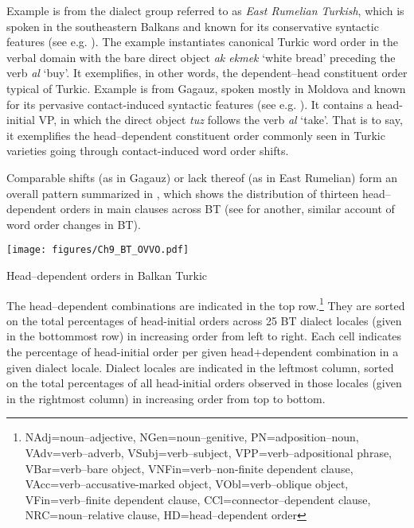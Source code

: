 \documentclass[output=paper,colorlinks,citecolor=brown]{langscibook}
\begin{document}
\noindent
Example  is from the dialect group referred to as \textit{East Rumelian Turkish}, which is spoken in the southeastern Balkans and known for its conservative syntactic features (see e.g. \citealt[49]{Johanson.2021}). The example instantiates canonical Turkic word order in the verbal domain with the bare direct object \textit{ak ekmek} `white bread' preceding the verb \textit{al} `buy'. It exemplifies, in other words, the dependent--head constituent order typical of Turkic. Example  is from Gagauz, spoken mostly in Moldova and known for its pervasive contact-induced syntactic features (see e.g. \citealt[50--51]{Johanson.2021}). It contains a head-initial VP, in which the direct object \textit{tuz} follows the verb \textit{al} `take'. That is to say, it exemplifies the head--dependent constituent order commonly seen in Turkic varieties going through contact-induced word order shifts. 

Comparable shifts (as in Gagauz) or lack thereof (as in East Rumelian) form an overall pattern summarized in , which shows the distribution of thirteen head--dependent orders in main clauses across BT (see \citealp{Keskin.directionality} for another, similar account of word order changes in BT).

\begin{table}
  \texttt{[image: figures/Ch9\_BT\_OVVO.pdf]}
  \caption{Head--dependent orders in Balkan Turkic}
  \label{tab:keskin:BT_OVVO}
\end{table}

The head--dependent combinations are indicated in the top row.\footnote{NAdj=noun--adjective, NGen=noun--genitive, PN=adposition--noun, VAdv=verb--adverb, VSubj=verb--subject, VPP=verb--adpositional phrase, VBar=verb--bare object, VNFin=verb--non-finite dependent clause, VAcc=verb--accusative-marked object, VObl=verb--oblique object, VFin=verb--finite dependent clause, CCl=connector--dependent clause, NRC=noun--relative clause, HD=head--dependent order} They are sorted on the total percentages of head-initial orders across 25 BT dialect locales (given in the bottommost row) in increasing order from left to right. Each cell indicates the percentage of head-initial order per given head$+$dependent combination in a given dialect locale. Dialect locales are indicated in the leftmost column, sorted on the total percentages of all head-initial orders observed in those locales (given in the rightmost column) in increasing order from top to bottom. 
\end{document}
